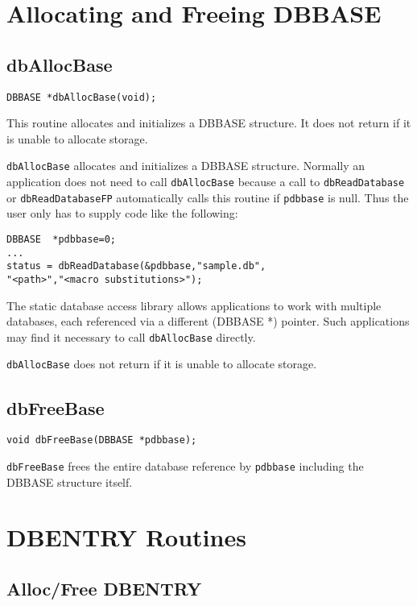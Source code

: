 \section{Allocating and Freeing DBBASE}

\subsection{dbAllocBase}

\begin{verbatim}DBBASE *dbAllocBase(void);
\end{verbatim}This routine allocates and initializes a DBBASE structure. It does not return if it is unable to allocate storage.

\verb|dbAllocBase| allocates and initializes a DBBASE structure. Normally an application does not need to call 
\verb|dbAllocBase| because a call to \verb|dbReadDatabase| or \verb|dbReadDatabaseFP| automatically calls this routine if 
\verb|pdbbase| is null. Thus the user only has to supply code like the following:

\begin{verbatim}DBBASE  *pdbbase=0;
...
status = dbReadDatabase(&pdbbase,"sample.db",
"<path>","<macro substitutions>");
\end{verbatim}The static database access library allows applications to work with multiple databases, each referenced via a different 
(DBBASE *) pointer. Such applications may find it necessary to call \verb|dbAllocBase| directly.

\verb|dbAllocBase| does not return if it is unable to allocate storage.

\subsection{dbFreeBase}

\begin{verbatim}void dbFreeBase(DBBASE *pdbbase);
\end{verbatim}\verb|dbFreeBase| frees the entire database reference by \verb|pdbbase| including the DBBASE structure itself.

\section{DBENTRY Routines}

\subsection{Alloc/Free DBENTRY}

